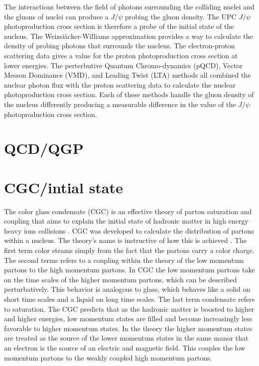     The interactions between the field of photons surrounding the colliding 
      nuclei and the gluons of nuclei can produce a $J/\psi$ probing the 
      gluon density.
    The UPC $J/\psi$ photoproduction cross section is therefore a probe of 
      the initial state of the nucleus. 
    The Weizsi\"{a}cker-Williams approximation provides a way to calculate the 
      density of probing photons that surrounds the nucleus. 
    The electron-proton scattering data gives a value for the proton 
      photoproduction cross section at lower energies.
    The perterbutive Quantum Chromo-dynamics (pQCD), Vector Messon Dominance 
      (VMD), and Leading Twist (LTA) methods all combined the nuclear photon 
      flux with the proton scattering data to calculate the nuclear 
      photoproduction cross section.
    Each of these methods handle the gluon density of the nucleus differently 
      producing a measurable difference in the value of the $J/\psi$ 
      photoproduction cross section. 


  \section{QCD/QGP}


  \section{CGC/intial state}
  The color glass condensate (CGC) is an effective theory of parton saturation
  	and coupling that aims to explain the initial state of hadronic matter 
  	in high energy heavy ions collisions \cite{CGCandGlasma}. 
  CGC was developed to calculate the distribution of partons within a nucleus. 
  The theory's name is instructive of how this is achieved \cite{CGC2Lec}. 
  The first term color steams simply from the fact that the partons carry a color 
  	charge.
  The second terms refers to a coupling within the theory of the low momentum 
  	partons to the high momentum partons.
  In CGC the low momentum partons take on the time scales of the higher momentum 
  	partons, which can be described perturbatively. 
  This behavior is analogous to glass, which behaves like a solid on short time 
  	scales and a liquid on long time scales.
  The last term condensate refers to saturation.
  The CGC predicts that as the hadronic matter is boosted to higher and higher 
  	energies, low momentum states are filled and become increasingly less 
  	favorable to higher momentum states.
  In the theory the higher momentum states are treated as the source of the lower
  	momentum states in the same manor that an electron is the source of an
  	electric and magnetic field.
  This couples the low momentum partons to the weakly coupled high momentum 
  	partons. 
  
